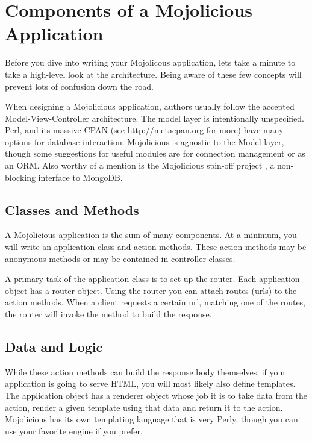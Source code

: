 \section{Components of a Mojolicious Application}

Before you dive into writing your Mojolicous application, lets take a minute to take a high-level look at the architecture.
Being aware of these few concepts will prevent lots of confusion down the road.

When designing a Mojolicious application, authors usually follow the accepted Model-View-Controller architecture.
The model layer is intentionally unspecified.
Perl, and its massive CPAN (see \url{http://metacpan.org} for more) have many options for database interaction.
Mojolicious is agnostic to the Model layer, though some suggestions for useful modules are  for connection management or  as an ORM.
Also worthy of a mention is the Mojolicious spin-off project , a non-blocking interface to MongoDB.

\subsection{Classes and Methods}

A Mojolicious application is the sum of many components.
At a minimum, you will write an application class and action methods.
These action methods may be anonymous methods or may be contained in controller classes.

A primary task of the application class is to set up the router.
Each application object has a router object.
Using the router you can attach routes (urls) to the action methods.
When a client requests a certain url, matching one of the routes, the router will invoke the method to build the response.

\subsection{Data and Logic}

While these action methods can build the response body themselves, if your application is going to serve HTML, you will most likely also define templates.
The application object has a renderer object whose job it is to take data from the action, render a given template using that data and return it to the action.
Mojolicious has its own templating language that is very Perly, though you can use your favorite engine if you prefer.

